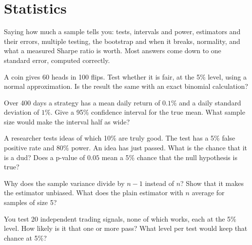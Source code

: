 \chapter{Statistics}\label{ch:iv1:statistics}

\begin{ivtrains}
Saying how much a sample tells you: tests, intervals and power, estimators and their errors, multiple testing, the bootstrap and when it breaks, normality, and what a measured Sharpe ratio is worth. Most answers come down to one standard error, computed correctly.
\end{ivtrains}

\begin{question}\label{iq:iv1:statistics:1}
A coin gives 60 heads in 100 flips. Test whether it is fair, at the 5\% level, using a normal approximation. Is the result the same with an exact binomial calculation?
\end{question}

\begin{question}\label{iq:iv1:statistics:2}
Over 400 days a strategy has a mean daily return of $0.1\%$ and a daily standard deviation of $1\%$. Give a 95\% confidence interval for the true mean. What sample size would make the interval half as wide?
\end{question}

\begin{question}\label{iq:iv1:statistics:3}
A researcher tests ideas of which 10\% are truly good. The test has a 5\% false positive rate and 80\% power. An idea has just passed. What is the chance that it is a dud? Does a p-value of $0.05$ mean a 5\% chance that the null hypothesis is true?
\end{question}

\begin{question}\label{iq:iv1:statistics:4}
Why does the sample variance divide by $n - 1$ instead of $n$? Show that it makes the estimator unbiased. What does the plain estimator with $n$ average for samples of size 5?
\end{question}

\begin{question}\label{iq:iv1:statistics:5}
You test 20 independent trading signals, none of which works, each at the 5\% level. How likely is it that one or more pass? What level per test would keep that chance at 5\%?
\end{question}

